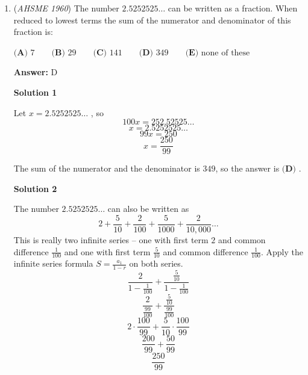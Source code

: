 \begin{enumerate}
\textbf{Solution 1}

Since Circle $I$ is tangent to circle $II$ and touches the center of circle $II$, the diameter of circle $I$ is the radius of circle $II$.

 That means circle $II$ is twice as big as circle $I$, so the area of circle $II$ is four times as big as circle $I$.

 The area of circle $II$ is $16$ square inches, so the answer is $\boxed{\textbf{(D)}}$.

 



\textbf{Solution 2}

Since Circle $I$ is tangent to circle $II$ and touches the center of circle $II$, the diameter of circle $I$ is the radius of circle $II$.

 Applying the area formula $A = \pi r^2$, substitute $4$ for $A$ to solve for the radius of circle $1$.
 \[4 = \pi r^2\]
 \[\frac{4}{\pi} = r^2\]
 \[r = \frac{2}{\sqrt{\pi}}\]

 That means the diameter of circle $I$ (or the radius of circle $II$) is $\frac{4}{\sqrt{\pi}}$.  Apply the area formula again to find the area of circle $II$.
 \[A = \pi (\frac{2}{\sqrt{\pi}})^2 = \pi \cdot \frac{4}{\pi} = 16\]

 The answer is $\boxed{\textbf{(D)}}$.

 


	\item (\textit{AHSME 1960}) The number $2.5252525\ldots$ can be written as a fraction. 
When reduced to lowest terms the sum of the numerator and denominator of this fraction is:


 $\textbf{(A) }7\qquad \textbf{(B) } 29\qquad \textbf{(C) }141\qquad \textbf{(D) }349\qquad \textbf{(E) }\text{none of these}$

 \textbf{Answer: }D



\textbf{Solution 1}

Let $x = 2.5252525\ldots$ , so
 \[100x = 252.52525\ldots\]
 \[x = 2.5252525\ldots\]
 \[99x = 250\]
 \[x = \frac{250}{99}\]

 The sum of the numerator and the denominator is $349$, so the answer is $\boxed{\textbf{(D)}}$ .

 



\textbf{Solution 2}

The number $2.5252525\ldots$ can also be written as
 \[2+\frac{5}{10} + \frac{2}{100} + \frac{5}{1000} + \frac{2}{10,000} \ldots\]This is really two infinite series -- one with first term $2$ and common difference $\frac{1}{100}$ and one with first term $\frac{5}{10}$ and common difference $\frac{1}{100}$.  Apply the infinite series formula $S = \frac{a_1}{1-r}$ on both series.
 \[\frac{2}{1-\frac{1}{100}} + \frac{\frac{5}{10}}{1-\frac{1}{100}}\]
 \[\frac{2}{\frac{99}{100}} + \frac{\frac{5}{10}}{\frac{99}{100}}\]
 \[2 \cdot \frac{100}{99} + \frac{5}{10} \cdot \frac{100}{99}\]
 \[\frac{200}{99} + \frac{50}{99}\]
 \[\frac{250}{99}\]


\end{enumerate}
